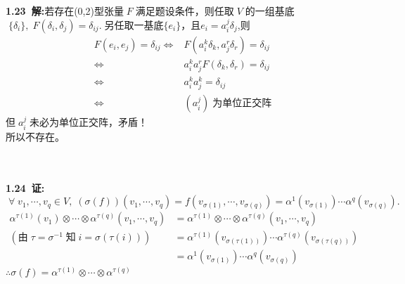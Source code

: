 \noindent
\\
\\
{\textbf{1.23\ 解:}}\;若存在\;(0,2)\;型张量$\;F\;$满足题设条件，则任取$\;V\;$的一组基底$\;\{\delta_i\},\;F(\delta_i,\delta_j)=\delta_{ij}.\;$另任取一基底\;$\{e_i\}$\;，且\;$e_i=a_i^j\delta_j$,\;则
\begin{align*}
F(e_i,e_j)=\delta_{ij}\Leftrightarrow & F(a_i^k\delta_k,a_j^r\delta_r)=\delta_{ij}
\\
\Leftrightarrow &a_i^k a_j^r F(\delta_k,\delta_r)=\delta_{ij}
\\
\Leftrightarrow &a_i^k a_j^k=\delta_{ij} 
\\
\Leftrightarrow &(a_i^j)\; \text{为单位正交阵}
\end{align*}
但$\;a_i^j\;$未必为单位正交阵，矛盾！
\\
所以不存在。

\noindent
\\
\\
{\textbf{1.24\ 证:}}$\;\forall\; v_1,\cdots ,v_q \in V,\; (\sigma(f))(v_1,\cdots ,v_q)=f(v_{\sigma(1)},\cdots ,v_{\sigma(q)})=\alpha^1(v_{\sigma(1)})\cdots \alpha^q (v_{\sigma(q)}).$
\begin{align*}
\alpha^{\tau (1)}(v_1)\otimes \cdots \otimes \alpha^{\tau (q)}(v_1,\cdots ,v_q)&=\alpha ^{\tau(1)}\otimes \cdots \otimes \alpha ^{\tau(q)}(v_1,\cdots ,v_q)\;
\\
(\text{由}\; \tau =\sigma^{-1}\; \text{知}\; i=\sigma(\tau (i)))\quad     
&=\alpha^{\tau(1)}(v_{\sigma(\tau (1))})\cdots \alpha^{\tau(q)}(v_{\sigma(\tau (q))})
\\
&=\alpha^{1}(v_{\sigma(1)})\cdots \alpha^{q}(v_{\sigma(q)})
\end{align*}
$\therefore \sigma(f)=\alpha^{\tau(1)}\otimes\cdots\otimes \alpha^{\tau(q)}$

